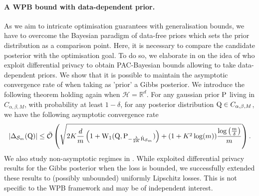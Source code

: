 \paragraph{A WPB bound with data-dependent prior.}
As we aim to intricate optimisation guarantees with generalisation bounds, we have to overcome the Bayesian paradigm of data-free priors which sets the prior distribution as a comparison point. Here, it is necessary to compare the candidate posterior with the optimisation goal. To do so, we elaborate in  on the idea of \citet{dziugaite2018data} who exploit differential privacy to obtain PAC-Bayesian bounds allowing to take data-dependent priors. We show that it is possible to maintain the asymptotic convergence rate of  when taking as 'prior' a Gibbs posterior.
We introduce the following theorem holding again when $\mathcal{H}=\mathbb{R}^d$. For any gaussian prior $\P$ living in $C_{\alpha,\beta,M}$, with probability at least $1-\delta$, for any posterior distribution $\Q\in C_{\alpha,\beta,M}$, we have the following asymptotic convergence rate
\begin{align*}
|\Delta_{\Sm}(\Q)|  \leq\Tilde{\mathcal{O}}\left( \sqrt{2K\frac{d}{m}\left(1 + \W_{1}(\Q,\P_{-\frac{\lambda}{2K}\Riskhat_{\Sm}})\right)+(1+K^2\log(m))\frac{\log\left( \frac{m}{\delta} \right)}{m}}   \right).
\end{align*}
We also study non-asymptotic regimes in . While \citet{dziugaite2018data} exploited differential privacy results for the Gibbs posterior when the loss is bounded, we successfully extended these results to (possibly unbounded) uniformly Lipschitz losses. This is not specific to the WPB framework and may be of independent interest.

